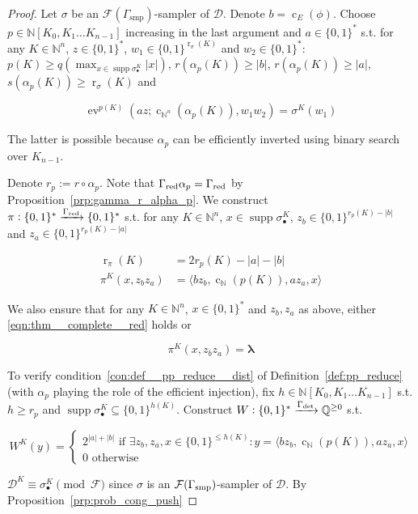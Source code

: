 \documentclass[11pt]{article}
\numberwithin{equation}{section}
\theoremstyle{definition}
\theoremstyle{plain}
\newcommand{\Bool}{\{0,1\}}
\newcommand{\Words}{{\Bool^*}}
\DeclareMathOperator{\Supp}{supp}
\DeclareMathOperator{\Ev}{ev}
\DeclareMathOperator{\R}{r}
\DeclareMathOperator{\En}{c}
\newcommand{\Nats}{\mathbb{N}}
\newcommand{\Rats}{\mathbb{Q}}
\newcommand{\NatPoly}{\Nats[K_0, K_1 \ldots K_{n-1}]}
\newcommand{\Estr}{\bm{\lambda}}
\newcommand{\Abs}[1]{\lvert #1 \rvert}
\newcommand{\Chev}[1]{\langle #1 \rangle}
\newcommand{\Dist}{\mathcal{D}}
\newcommand{\Fall}{\mathcal{F}}
\begin{document}
\begin{proof}

Let ${\sigma}$ be an ${\Fall(\Gamma_{\text{smp}})}$-sampler of ${\Dist}$. Denote ${b=\En_E(\phi)}$. Choose ${p \in \NatPoly}$ increasing in the last argument and ${a \in \Words}$ s.t. for any ${K \in \Nats^{n}}$, $z \in \Words$, ${w_1 \in \Bool^{\R_\sigma(K)}}$ and ${w_2 \in \Words}$: ${p(K) \geq q(\max_{x \in \Supp \sigma_\bullet^K} \Abs{x})}$, ${r(\alpha_p(K)) \geq \Abs{b}}$, ${r(\alpha_p(K)) \geq \Abs{a}}$, ${s(\alpha_p(K)) \geq \R_\sigma(K)}$ and 

\[\Ev^{p(K)}(az;\En_{\Nats^n}(\alpha_p(K)),w_1 w_2)=\sigma^{K}(w_1)\]

The latter is possible because ${\alpha_p}$ can be efficiently inverted using binary search over ${K_{n-1}}$.

Denote ${r_p := r \circ \alpha_p}$. Note that ${\Gamma_{\textnormal{red}} \alpha_p = \Gamma_{\textnormal{red}}}$ by Proposition~\ref{prp:gamma_r_alpha_p}. We construct\\ $\pi: \Words \xrightarrow{\Gamma_{\textnormal{red}}} \Words$ s.t. for any ${K \in \Nats^{n}}$, ${x \in \Supp \sigma_{\bullet}^{K}}$, ${z_b \in \Bool^{r_p(K)-\Abs{b}}}$ and ${z_a \in \Bool^{r_p(K)-\Abs{a}}}$

\begin{align}
\R_\pi(K) &= 2r_p(K)-\Abs{a}-\Abs{b} \\
\label{eqn:thm__complete__red}\pi^{K}(x,z_b z_a)&=\Chev{bz_b,\En_\Nats(p(K)),a z_a, x} 
\end{align}

We also ensure that for any ${K \in \Nats^n}$, ${x \in \Words}$ and ${z_b,z_a}$ as above, either \ref{eqn:thm__complete__red} holds or 

\[\pi^K(x,z_b z_a)=\Estr\]

To verify condition~\ref{con:def__pp_reduce__dist} of Definition~\ref{def:pp_reduce} (with ${\alpha_p}$ playing the role of the efficient injection), fix ${h \in \NatPoly}$ s.t. $h \geq r_p$ and $\Supp \sigma_\bullet^K \subseteq \Bool^{h(K)}$. Construct ${W: \Words \xrightarrow{\Gamma_{\textnormal{det}}} \Rats^{\geq 0}}$ s.t. 

\[W^K(y)=\begin{cases}2^{\Abs{a}+\Abs{b}} \text{ if } \exists z_b,z_a,x \in \Bool^{\leq h(K)}: y=\Chev{bz_b,\En_\Nats(p(K)), az_a,x}\\0 \text{ otherwise}\end{cases}\]

${\Dist^K \equiv \sigma_\bullet^K \pmod{\Fall}}$ since ${\sigma}$ is an ${\Fall(\Gamma_{\textnormal{smp}})}$-sampler of ${\Dist}$. By Proposition~\ref{prp:prob_cong_push}


\end{proof}
\end{document}
